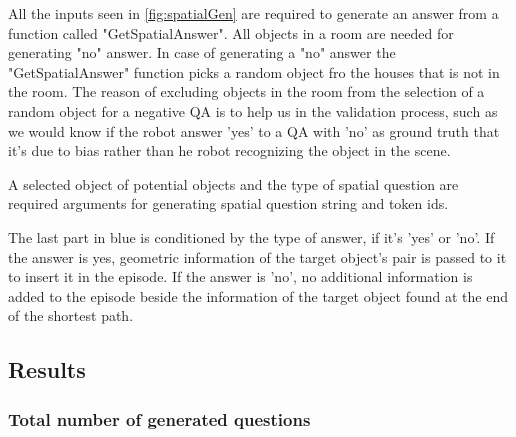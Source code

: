 All the inputs seen in \ref{fig:spatialGen} are required to generate an answer from a function called "GetSpatialAnswer". All objects in a room are needed for generating "no" answer. In case of generating a "no" answer the "GetSpatialAnswer" function picks a random object fro the houses that is not in the room. The reason of excluding objects in the room from the selection of a random object for a negative QA is to help us in the validation process, such as we would know if the robot answer 'yes' to a QA with 'no' as ground truth that it's due to bias rather than he robot recognizing the object in the scene. 

A selected object of potential objects and the type of spatial question are required arguments for generating spatial question string and token ids. 

The last part in blue is conditioned by the type of answer, if it's 'yes' or 'no'. If the answer is yes, geometric information of the target object's pair is passed to it to insert it in the episode. If the answer is 'no', no additional information is added to the episode beside the information of the target object found at the end of the shortest path. 


\subsection{Results}

\subsubsection{Total number of generated questions}

